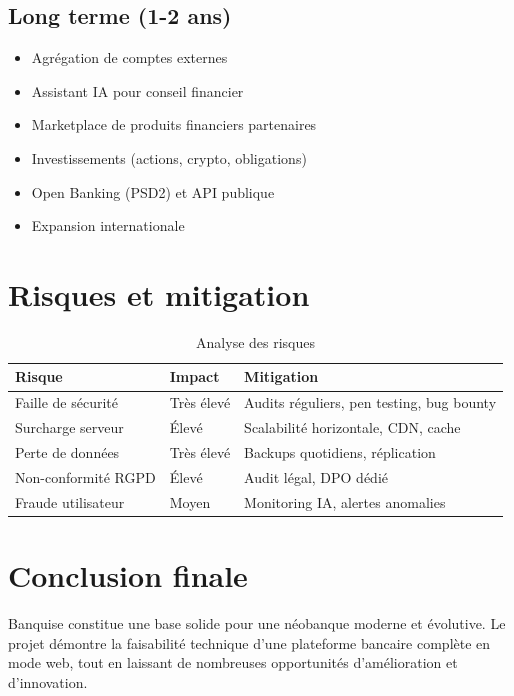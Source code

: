 \documentclass[12pt,a4paper]{report}
\begin{document}
\subsection{Long terme (1-2 ans)}
\begin{itemize}[leftmargin=1.5cm]
    \item Agrégation de comptes externes
    \item Assistant IA pour conseil financier
    \item Marketplace de produits financiers partenaires
    \item Investissements (actions, crypto, obligations)
    \item Open Banking (PSD2) et API publique
    \item Expansion internationale
\end{itemize}

\section{Risques et mitigation}

\begin{table}[H]
\centering
\begin{tabular}{|p{4cm}|p{5cm}|p{5cm}|}
\hline
\rowcolor{banquiseblue!30}
\textbf{Risque} & \textbf{Impact} & \textbf{Mitigation} \\
\hline
Faille de sécurité & Très élevé & Audits réguliers, pen testing, bug bounty \\
\hline
Surcharge serveur & Élevé & Scalabilité horizontale, CDN, cache \\
\hline
Perte de données & Très élevé & Backups quotidiens, réplication \\
\hline
Non-conformité RGPD & Élevé & Audit légal, DPO dédié \\
\hline
Fraude utilisateur & Moyen & Monitoring IA, alertes anomalies \\
\hline
\end{tabular}
\caption{Analyse des risques}
\end{table}

\section{Conclusion finale}
Banquise constitue une base solide pour une néobanque moderne et évolutive. Le projet démontre la faisabilité technique d'une plateforme bancaire complète en mode web, tout en laissant de nombreuses opportunités d'amélioration et d'innovation.
\end{document}
